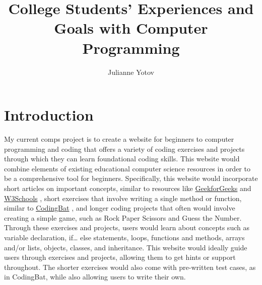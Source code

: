 \documentclass[10pt,twocolumn]{article}
\title{College Students' Experiences and Goals with Computer Programming}
\author{Julianne Yotov}
\affiliation{Occidental College}
\begin{document}
\maketitle

\section{Introduction}
My current comps project is to create a website for beginners to computer programming and coding that offers a variety of coding exercises and projects through which they can learn foundational coding skills. This website would combine elements of existing educational computer science resources in order to be a comprehensive tool for beginners. Specifically, this website would incorporate short articles on important concepts, similar to resources like \href{https://www.geeksforgeeks.org/}{GeekforGeeks} \cite{GeeksforGeeks} and \href{https://www.w3schools.com/}{W3Schools} \cite{W3Schools}, short exercises that involve writing a single method or function, similar to \href{https://codingbat.com/java}{CodingBat} \cite{CodingBat}, and longer coding projects that often would involve creating a simple game, such as Rock Paper Scissors and Guess the Number. Through these exercises and projects, users would learn about concepts such as variable declaration, if… else statements, loops, functions and methods, arrays and/or lists, objects, classes, and inheritance. This website would ideally guide users through exercises and projects, allowing them to get hints or support throughout. The shorter exercises would also come with pre-written test cases, as in CodingBat, while also allowing users to write their own. 
\end{document}
